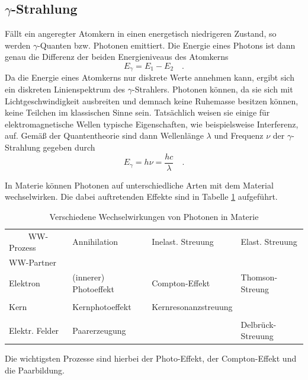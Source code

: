 \subsection{\texorpdfstring{$\gamma$}{}-Strahlung}
Fällt ein angeregter Atomkern in einen energetisch niedrigeren Zustand, so werden $\gamma$-Quanten bzw. Photonen emittiert. Die Energie eines
Photons ist dann genau die Differenz der beiden Energieniveaus des Atomkerns
\begin{equation}
E_{\gamma}=E_1-E_2 \quad.
\end{equation}
Da die Energie eines Atomkerns nur diskrete Werte annehmen kann, ergibt sich ein diskreten Linienspektrum des $\gamma$-Strahlers.
Photonen können, da sie sich mit Lichtgeschwindigkeit ausbreiten und demnach keine Ruhemasse besitzen können, keine Teilchen im klassischen Sinne sein.
Tatsächlich weisen sie einige für elektromagnetische Wellen typische Eigenschaften, wie beispielsweise Interferenz, auf. Gemäß der Quantentheorie sind dann Wellenlänge
$\lambda$ und Frequenz $\nu$ der $\gamma$-Strahlung gegeben durch
\begin{equation}
E_{\gamma}=h\nu=\frac{hc}{\lambda}\quad .
\end{equation}

In Materie können Photonen auf unterschiedliche Arten mit dem Material wechselwirken. Die dabei auftretenden Effekte sind in Tabelle \ref{tab:ttab1} aufgeführt.
\FloatBarrier
\begin{table}[h]
    \centering
    \caption{Verschiedene Wechselwirkungen von Photonen in Materie}
    \label{tab:ttab1}
    \begin{tabular}{l | l l l}
        \toprule
        {$\qquad$ WW-Prozess} & {Annihilation} & {Inelast. Streuung} & {Elast. Streuung}\\
        \multicolumn{1}{l}{WW-Partner}\\
        \midrule
        Elektron & (innerer) Photoeffekt & Compton-Effekt & Thomson-Streung\\
        &\\
        Kern &Kernphotoeffekt & Kernresonanzstreuung \\
        &\\
        Elektr. Felder & Paarerzeugung & & Delbrück-Streuung\\
        \bottomrule
    \end{tabular}
\end{table}
\FloatBarrier
\noindent
Die wichtigsten Prozesse sind hierbei der Photo-Effekt, der Compton-Effekt und die Paarbildung.

